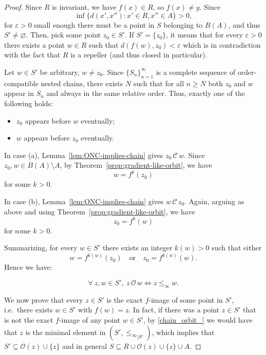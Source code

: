 \documentclass[10pt,a4paper]{article}
\theoremstyle{definition}
\theoremstyle{remark}
\theoremstyle{plain}
\begin{document}
\begin{proof}
Since $R$ is invariant, we have $f(x)\in R$, so $f(x)\neq y$. Since $$\inf \{d(x',x''):x'\in R, x''\in A\}>0,$$ for $\varepsilon>0$ small enough there must be a point in $S$ belonging to $B(A)$, and thus $S'\neq\varnothing$. Then, pick some point $z_0\in S'$. If $S'=\{z_0\}$, it means that for every $\varepsilon>0$ there exists a point $w\in R$ such that $d(f(w),z_0)<\varepsilon$ which is in  contradiction with the fact that $R$ is a repeller (and thus closed in particular).

Let $w\in S'$ be arbitrary, $w\neq z_0$. Since $\{S_n\}_{n=1}^{\infty}$ is
a complete sequence of order-compatible nested chains, there exists $N$ such that for all $n\ge N$ both
$z_0$ and $w$ appear in $S_n$ and always in the same relative order.
Thus, exactly one of the following holds:

\begin{itemize}
    \item[(a)] $z_0$ appears before $w$ eventually;
    \item[(b)] $w$ appears before $z_0$ eventually.
\end{itemize}

In case (a), Lemma~\ref{lem:ONC-implies-chain} gives
$z_0\,\mathcal{C}\,w$. Since $z_0,w\in B(A)\setminus A$, by Theorem~\ref{prop:gradient-like-orbit}, we have
$$w = f^{k}(z_0)$$
for some $k>0$.

In case (b), Lemma~\ref{lem:ONC-implies-chain} gives $w\,\mathcal{C}\,z_0$.
Again, arguing as above and using Theorem~\ref{prop:gradient-like-orbit}, we have
$$z_0 = f^{k}(w)$$
for some $k> 0$.

Summarizing, for every $w\in S'$ there exists an integer
$k(w)> 0$ such that either
$$
   w = f^{k(w)}(z_0)
   \quad\text{or}\quad
   z_0 = f^{k(w)}(w).
$$
Hence we have: 

\begin{equation}\label{chain_orbit_}
\forall\  z,w\in S', \ z\,\mathcal{O}\,w \iff z\le_\infty w.
\end{equation}

We now prove that every $z\in S'$ is the exact $f$-image of some point in $S'$, i.e.\ there exists $w\in S'$ with $f(w)=z$. In fact, if there was a point $z\in S'$ that is not the exact $f$-image of any point $w\in S'$, by \eqref{chain_orbit_} we would have that $z$ is the minimal element in $(S',{\le_\infty}_{|S'})$, which implies that $S'\subseteq\mathcal{O}(z)\cup\{z\}$ and in general $S\subseteq R\cup\mathcal{O}(z)\cup\{z\}\cup A$.


\end{proof}
\end{document}
